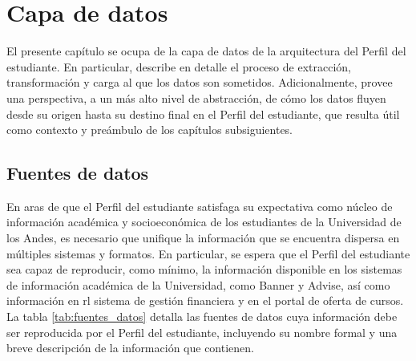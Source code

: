 \chapter{Capa de datos}

El presente capítulo se ocupa de la capa de datos de la arquitectura del Perfil del estudiante. En particular, describe en detalle el proceso de extracción, transformación y carga al que los datos son sometidos. Adicionalmente, provee una perspectiva, a un más alto nivel de abstracción, de cómo los datos fluyen desde su origen hasta su destino final en el Perfil del estudiante, que resulta útil como contexto y preámbulo de los capítulos subsiguientes.

\section{Fuentes de datos}

En aras de que el Perfil del estudiante satisfaga su expectativa como núcleo de información académica y socioeconómica de los estudiantes de la Universidad de los Andes, es necesario que unifique la información que se encuentra dispersa en múltiples sistemas y formatos. En particular, se espera que el Perfil del estudiante sea capaz de reproducir, como mínimo, la información disponible en los sistemas de información académica de la Universidad, como Banner y Advise, así como información en rl sistema de gestión financiera y en el portal de oferta de cursos. La tabla \ref{tab:fuentes_datos} detalla las fuentes de datos cuya información debe ser reproducida por el Perfil del estudiante, incluyendo su nombre formal y una breve descripción de la información que contienen. \cite{advise}

